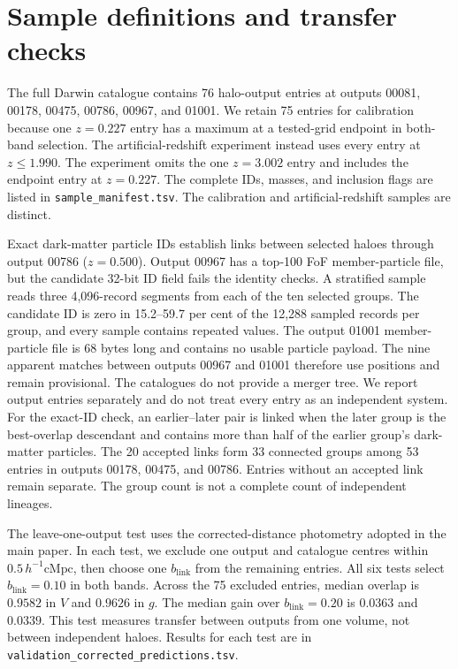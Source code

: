 \documentclass[usenatbib]{mnras}
\begin{document}
\section{Sample definitions and transfer checks}
The full Darwin catalogue contains 76 halo-output entries at outputs
00081, 00178, 00475, 00786, 00967, and 01001. We retain 75 entries for
calibration because one $z=0.227$ entry has a maximum at a tested-grid
endpoint in both-band selection. The artificial-redshift experiment
instead uses every entry at $z\leq1.990$. The experiment omits the one
$z=3.002$ entry and includes the endpoint entry at $z=0.227$. The
complete IDs, masses, and inclusion flags are listed in
\texttt{sample\_manifest.tsv}. The calibration and artificial-redshift samples are distinct.

Exact dark-matter particle IDs establish links between selected haloes
through output 00786 ($z=0.500$). Output 00967 has a top-100 FoF
member-particle file, but the candidate 32-bit ID field fails the identity
checks. A stratified sample reads three 4,096-record segments from each of
the ten selected groups. The candidate ID is zero in 15.2--59.7 per cent of
the 12,288 sampled records per group, and every sample contains repeated
values. The output 01001 member-particle file is 68 bytes long and contains
no usable particle payload. The nine apparent matches between outputs 00967
and 01001 therefore use positions and remain provisional. The catalogues do
not provide a merger tree. We report output entries separately and do not
treat every entry as an independent system. For the exact-ID check, an
earlier--later pair is linked when the later group is the best-overlap
descendant and contains more than half of the earlier group's dark-matter
particles. The 20 accepted links form 33 connected groups among 53 entries
in outputs 00178, 00475, and 00786. Entries without an accepted link remain
separate. The group count is not a complete count of independent lineages.

The leave-one-output test uses the corrected-distance photometry
adopted in the main paper. In each test, we exclude one output and
catalogue centres within $0.5\,h^{-1}\mathrm{cMpc}$, then choose one
$b_{\mathrm{link}}$ from the remaining entries. All six tests select
$b_{\mathrm{link}}=0.10$ in both bands. Across the 75 excluded entries,
median overlap is $0.9582$ in $V$ and $0.9626$ in $g$. The median gain
over $b_{\mathrm{link}}=0.20$ is $0.0363$ and $0.0339$. This test
measures transfer between outputs from one volume, not between
independent haloes. Results for each test are in
\texttt{validation\_corrected\_predictions.tsv}.
\end{document}
